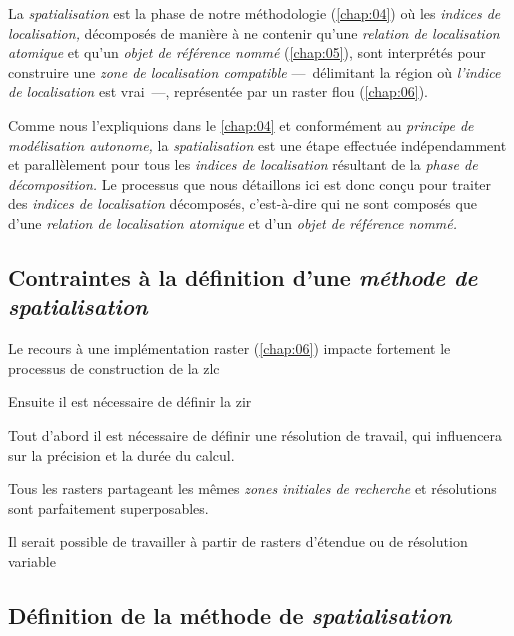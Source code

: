 La \emph{spatialisation} est la phase de notre méthodologie
(\autoref{chap:04}) où les \emph{indices de localisation,} décomposés
de manière à ne contenir qu'une \emph{relation de localisation
  atomique} et qu'un \emph{objet de référence nommé}
(\autoref{chap:05}), sont interprétés pour construire une \emph{zone
  de localisation compatible} ---~délimitant la région où
\emph{l'indice de localisation} est vrai~---, représentée par un
raster flou (\autoref{chap:06}).

Comme nous l'expliquions dans le \autoref{chap:04} et conformément au
\emph{principe de modélisation autonome,} la \emph{spatialisation} est
une étape effectuée indépendamment et parallèlement pour tous les
\emph{indices de localisation} résultant de la \emph{phase de
  décomposition.} Le processus que nous détaillons ici est donc conçu
pour traiter des \emph{indices de localisation} décomposés,
c'est-à-dire qui ne sont composés que d'une \emph{relation de
  localisation atomique} et d'un \emph{objet de référence nommé.}

\subsection{Contraintes à la définition d'une \emph{méthode de spatialisation}}

Le recours à une implémentation raster (\autoref{chap:06}) impacte
fortement le processus de construction de la \ac{zlc}

%
Ensuite il est nécessaire de définir la \ac{zir}

%
Tout d'abord il est nécessaire de définir une résolution de travail,
qui influencera sur la précision et la durée du calcul.

Tous les rasters partageant les mêmes \emph{zones initiales de
  recherche} et résolutions sont parfaitement superposables.

%
Il serait possible de travailler à partir de rasters d'étendue ou de
résolution variable




\subsection{Définition de la méthode de \emph{spatialisation}}

